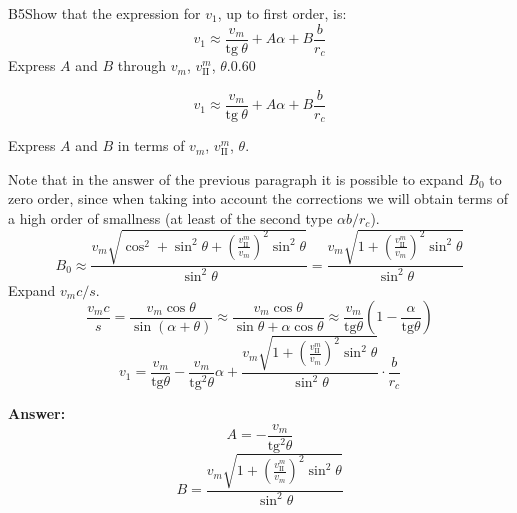 \documentclass[11pt,a4paper]{article}
\begin{document}
\begin{solcard}{B5}{Show that the expression for $v_1$, up to first order, is: $$v_1 \approx \dfrac{v_m}{\text{tg}~\theta} + A \alpha + B \frac{b}{r_c}$$ Express $A$ and $B$ through $v_m$, $v_\text{II}^m$, $\theta$.}{0.60}

$$v_1 \approx \dfrac{v_m}{\text{tg}~\theta} + A \alpha + B \frac{b}{r_c}$$


Express $A$ and $B$ in terms of $v_m$, $v_\text{II}^m$, $\theta$.


Note that in the answer of the previous paragraph it is possible to expand $B_0$ to zero order, since when taking into account the corrections we will obtain terms of a high order of smallness (at least of the second type $\alpha b/r_c$). $$B_0 \approx \frac{v_m\sqrt{\cos^2+\sin^2\theta+\left(\frac{v_\text{II}^m}{v_m}\right)^2\sin^2\theta}}{\sin^2\theta}=\frac{v_m\sqrt{1+\left(\frac{v_\text{II}^m}{v_m}\right)^2\sin^2\theta}}{\sin^2\theta}$$Expand $v_mc/s$. $$\frac{v_mc}{s} = \frac{v_m \cos\theta}{\sin(\alpha+\theta)}\approx\frac{v_m \cos\theta}{\sin\theta+\alpha\cos\theta}\approx\frac{v_m}{\text{tg}\theta}\left(1-\frac{\alpha}{\text{tg}\theta}\right)$$$$v_1 = \frac{v_m}{\text{tg}\theta}-\frac{v_m}{\text{tg}^2\theta}\alpha+\frac{v_m\sqrt{1+\left(\frac{v_\text{II}^m}{v_m}\right)^2\sin^2\theta}}{\sin^2\theta}\cdot\frac{b}{r_c}$$

\par\smallskip\noindent\textbf{Answer:} $$A = -\frac{v_m}{\text{tg}^2\theta}$$$$B = \frac{v_m\sqrt{1+\left(\frac{v_\text{II}^m}{v_m}\right)^2\sin^2\theta}}{\sin^2\theta}$$
\end{solcard}
\end{document}
